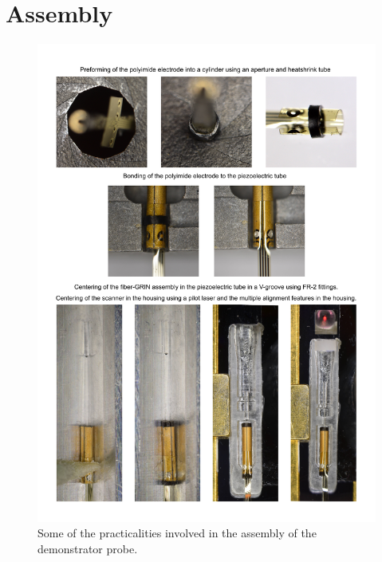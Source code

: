 \clearpage
\section{Assembly}
\begin{figure}[h!]\centering \includegraphics[width=12cm]{appendix/assyPhotos.pdf}
      \caption{Some of the practicalities involved in the assembly of the demonstrator probe.}
\end{figure}

\clearpage
